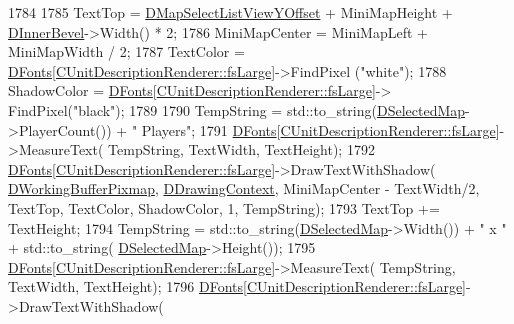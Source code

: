 \begin{DoxyCode}
1784     
1785     TextTop = \hyperlink{classCApplicationData_ae1a8eb3fff3cf5bc236564925bec1c8c}{DMapSelectListViewYOffset} + MiniMapHeight + 
      \hyperlink{classCApplicationData_a29a687c44dceb9e87a56d96612d59ab5}{DInnerBevel}->Width() * 2;
1786     MiniMapCenter = MiniMapLeft + MiniMapWidth / 2;
1787     TextColor = \hyperlink{classCApplicationData_afde9247d0a3ea87393ec86dcdb1e8274}{DFonts}[\hyperlink{classCUnitDescriptionRenderer_a3ea4cd83b6dd9533ab3abb953a7da35aaf467097fe4f4811a5e2f1959c86e071d}{CUnitDescriptionRenderer::fsLarge}]->FindPixel
      (\textcolor{stringliteral}{"white"});
1788     ShadowColor = \hyperlink{classCApplicationData_afde9247d0a3ea87393ec86dcdb1e8274}{DFonts}[\hyperlink{classCUnitDescriptionRenderer_a3ea4cd83b6dd9533ab3abb953a7da35aaf467097fe4f4811a5e2f1959c86e071d}{CUnitDescriptionRenderer::fsLarge}]->
      FindPixel(\textcolor{stringliteral}{"black"});
1789     
1790     TempString = std::to\_string(\hyperlink{classCApplicationData_abf74a18394e479b7090a8f9a55608867}{DSelectedMap}->PlayerCount()) + \textcolor{stringliteral}{" Players"};
1791     \hyperlink{classCApplicationData_afde9247d0a3ea87393ec86dcdb1e8274}{DFonts}[\hyperlink{classCUnitDescriptionRenderer_a3ea4cd83b6dd9533ab3abb953a7da35aaf467097fe4f4811a5e2f1959c86e071d}{CUnitDescriptionRenderer::fsLarge}]->MeasureText(
      TempString, TextWidth, TextHeight);
1792     \hyperlink{classCApplicationData_afde9247d0a3ea87393ec86dcdb1e8274}{DFonts}[\hyperlink{classCUnitDescriptionRenderer_a3ea4cd83b6dd9533ab3abb953a7da35aaf467097fe4f4811a5e2f1959c86e071d}{CUnitDescriptionRenderer::fsLarge}]->DrawTextWithShadow(
      \hyperlink{classCApplicationData_afa34cf2780f38dd28c0c811e69d60a97}{DWorkingBufferPixmap}, \hyperlink{classCApplicationData_aa6c5bea9bdcc64398e5a3f693661d37c}{DDrawingContext}, MiniMapCenter - TextWidth/2, 
      TextTop, TextColor, ShadowColor, 1, TempString);
1793     TextTop += TextHeight;
1794     TempString = std::to\_string(\hyperlink{classCApplicationData_abf74a18394e479b7090a8f9a55608867}{DSelectedMap}->Width()) + \textcolor{stringliteral}{" x "} + std::to\_string(
      \hyperlink{classCApplicationData_abf74a18394e479b7090a8f9a55608867}{DSelectedMap}->Height());
1795     \hyperlink{classCApplicationData_afde9247d0a3ea87393ec86dcdb1e8274}{DFonts}[\hyperlink{classCUnitDescriptionRenderer_a3ea4cd83b6dd9533ab3abb953a7da35aaf467097fe4f4811a5e2f1959c86e071d}{CUnitDescriptionRenderer::fsLarge}]->MeasureText(
      TempString, TextWidth, TextHeight);
1796     \hyperlink{classCApplicationData_afde9247d0a3ea87393ec86dcdb1e8274}{DFonts}[\hyperlink{classCUnitDescriptionRenderer_a3ea4cd83b6dd9533ab3abb953a7da35aaf467097fe4f4811a5e2f1959c86e071d}{CUnitDescriptionRenderer::fsLarge}]->DrawTextWithShadow(

\end{DoxyCode}
